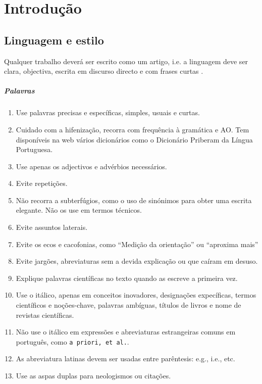 % 
%  
%
\chapter{Introdução}
\label{cha:introduction}

\section{Linguagem e estilo}
Qualquer trabalho deverá ser escrito como um artigo, i.e. a linguagem deve ser clara, objectiva, escrita em discurso directo e com frases curtas \cite{gustavii2016write}.

\paragraph{Palavras}
\begin{enumerate}
\item Use palavras precisas e específicas, simples, usuais e curtas.
\item Cuidado com a hifenização, recorra com frequência à gramática e AO. Tem disponíveis na web vários dicionários como o Dicionário Priberam da Língua Portuguesa.
\item Use apenas os adjectivos e advérbios necessários.
\item Evite repetições.
\item Não recorra a subterfúgios, como o uso de sinónimos para obter uma escrita elegante. Não os use em termos técnicos.
\item Evite assuntos laterais.
\item Evite os ecos e cacofonias, como ``Medição da orientação'' ou ``aproxima mais''
\item Evite jargões, abreviaturas sem a devida explicação ou que caíram em desuso.
\item Explique palavras científicas no texto quando as escreve a primeira vez.
\item Use o itálico, apenas em conceitos inovadores, designações expecíficas, termos científicos e noções-chave, palavras ambíguas, títulos de livros e nome de revistas científicas.
\item Não use o itálico em expressões e abreviaturas estrangeiras comuns em português, como \texttt{a priori, et al.}.
\item As abreviatura latinas devem ser usadas entre parêntesis: e.g., i.e., etc.
\item Use as aspas duplas para neologismos ou citações.
\end{enumerate}

